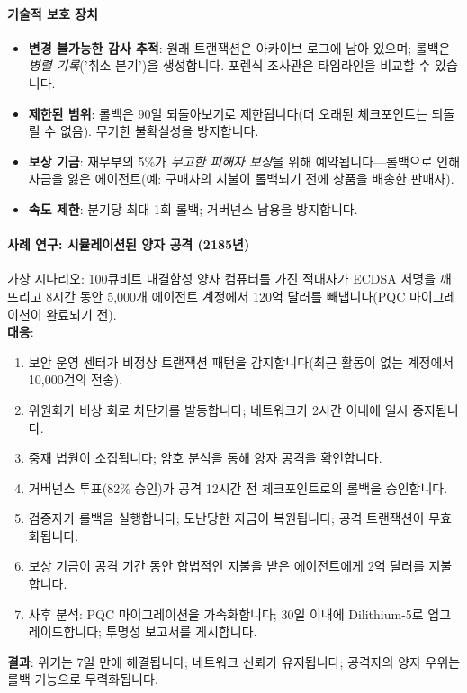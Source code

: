 \documentclass[11pt]{article}
\begin{document}
\paragraph{기술적 보호 장치}
\begin{itemize}[noitemsep]
  \item \textbf{변경 불가능한 감사 추적}: 원래 트랜잭션은 아카이브 로그에 남아 있으며; 롤백은 \emph{병렬 기록}('취소 분기')을 생성합니다. 포렌식 조사관은 타임라인을 비교할 수 있습니다.
  \item \textbf{제한된 범위}: 롤백은 90일 되돌아보기로 제한됩니다(더 오래된 체크포인트는 되돌릴 수 없음). 무기한 불확실성을 방지합니다.
  \item \textbf{보상 기금}: 재무부의 5\%가 \emph{무고한 피해자 보상}을 위해 예약됩니다—롤백으로 인해 자금을 잃은 에이전트(예: 구매자의 지불이 롤백되기 전에 상품을 배송한 판매자).
  \item \textbf{속도 제한}: 분기당 최대 1회 롤백; 거버넌스 남용을 방지합니다.
\end{itemize}

\paragraph{사례 연구: 시뮬레이션된 양자 공격 (2185년)}
가상 시나리오: 100큐비트 내결함성 양자 컴퓨터를 가진 적대자가 ECDSA 서명을 깨뜨리고 8시간 동안 5,000개 에이전트 계정에서 120억 달러를 빼냅니다(PQC 마이그레이션이 완료되기 전).\\
\textbf{대응}:
\begin{enumerate}[noitemsep]
  \item 보안 운영 센터가 비정상 트랜잭션 패턴을 감지합니다(최근 활동이 없는 계정에서 10,000건의 전송).
  \item 위원회가 비상 회로 차단기를 발동합니다; 네트워크가 2시간 이내에 일시 중지됩니다.
  \item 중재 법원이 소집됩니다; 암호 분석을 통해 양자 공격을 확인합니다.
  \item 거버넌스 투표(82\% 승인)가 공격 12시간 전 체크포인트로의 롤백을 승인합니다.
  \item 검증자가 롤백을 실행합니다; 도난당한 자금이 복원됩니다; 공격 트랜잭션이 무효화됩니다.
  \item 보상 기금이 공격 기간 동안 합법적인 지불을 받은 에이전트에게 2억 달러를 지불합니다.
  \item 사후 분석: PQC 마이그레이션을 가속화합니다; 30일 이내에 Dilithium-5로 업그레이드합니다; 투명성 보고서를 게시합니다.
\end{enumerate}
\textbf{결과}: 위기는 7일 만에 해결됩니다; 네트워크 신뢰가 유지됩니다; 공격자의 양자 우위는 롤백 기능으로 무력화됩니다.
\end{document}

